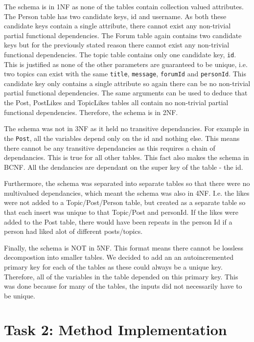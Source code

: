 \documentclass{article}
\begin{document}
The schema is in 1NF as none of the tables contain collection valued attributes. 
The Person table has two candidate keys, id and username. As both these candidate keys contain a single attribute, there cannot exist any non-trivial partial functional dependencies. The Forum table again contains two candidate keys but for the previously stated reason there cannot exist any non-trivial functional dependencies. The topic table contains only one candidate key, \texttt{id}. This is justified as none of the other parameters are guaranteed to be unique, i.e. two topics can exist with the same \texttt{title}, \texttt{message}, \texttt{forumId} and \texttt{personId}. This candidate key only contains a single attribute so again there can be no non-trivial partial functional dependencies. The same arguments can be used to deduce that the Post, PostLikes and TopicLikes tables all contain no non-trivial partial functional dependencies. Therefore, the schema is in 2NF.

The schema was not in 3NF as it held no transitive dependancies. For example in the \texttt{Post}, all the variables depend only on the id and nothing else. This means there cannot be any transitive dependancies as this requires a chain of dependancies. This is true for all other tables. This fact also makes the schema in BCNF. All the dendancies are dependant on the super key of the table - the id.

Furthermore, the schema was separated into separate tables so that there were no multivalued dependancies, which meant the schema was also in 4NF. I.e. the likes were not added to a Topic/Post/Person table, but created as a separate table so that each insert was unique to that Topic/Post and personId. If the likes were added to the Post table, there would have been repeats in the person Id if a person had liked alot of different posts/topics.

Finally, the schema is NOT in 5NF. This format means there cannot be lossless decompostion into smaller tables. We decided to add an an autoincremented primary key for each of the tables as these could always be a unique key. Therefore, all of the variables in the table depended on this primary key. This was done because for many of the tables, the inputs did not necessarily have to be unique. 



\newpage
\section*{Task 2: Method Implementation}
\end{document}
